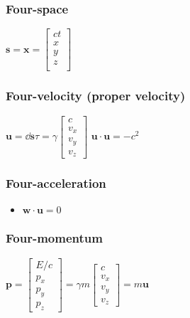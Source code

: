 \subsubsection{Four-space}			
\begin{itemize}
\itemt \(\mathbf{s} = \mathbf{x} = 
\begin{bmatrix}
ct \\
x \\
y \\
z \\
\end{bmatrix}
\)
\end{itemize}

\subsubsection{Four-velocity (proper velocity)}			
\begin{itemize}
\itemt \(\textbf{u} = \dd{\textbf{s}}{\tau} = \gamma 
\begin{bmatrix} 
c \\
v_x\\
v_y\\
v_z
\end{bmatrix}\)
\itemt \( \textbf{u}\cdot\textbf{u} = -c^2  \)
\end{itemize}

\subsubsection{Four-acceleration}			
\begin{itemize}
\itemt \(\textbf{w} = \dd{\textbf{u}}{\tau} = \gamma 
\begin{bmatrix} 
c \\
v_x\\
v_y\\
v_z
\end{bmatrix}\)
\item \( \textbf{w}\cdot\textbf{u} = 0 \)
\end{itemize}

\subsubsection{Four-momentum}			
\begin{itemize}
\itemt \(\textbf{p} = 
\begin{bmatrix} 
E/c \\
p_x\\
p_y\\
p_z
\end{bmatrix} = \gamma m
\begin{bmatrix} 
c \\
v_x\\
v_y\\
v_z
\end{bmatrix} = m\textbf{u}\)
\end{itemize}	
                
